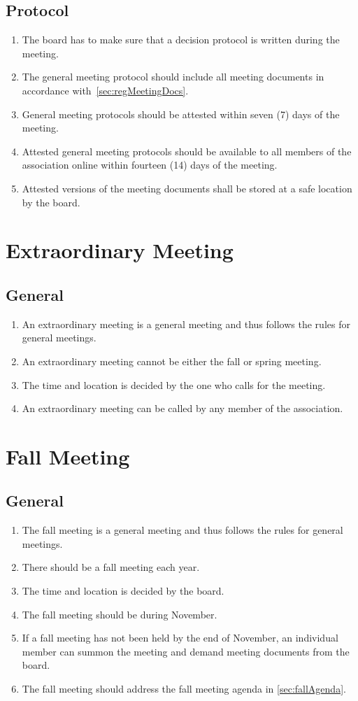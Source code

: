 \subsection{Protocol}
\begin{enumerate}
  \item The board has to make sure that a decision protocol is written during the meeting.
  \item The general meeting protocol should include all meeting documents in accordance with~\ref{sec:regMeetingDocs}.
  \item General meeting protocols should be attested within seven (7) days of the meeting.
  \item Attested general meeting protocols should be available to all members of the association online within fourteen (14) days of the meeting.
  \item Attested versions of the meeting documents shall be stored at a safe location by the board. 
\end{enumerate}

\section*{Extraordinary Meeting}
\subsection{General}
\begin{enumerate}
  \item An extraordinary meeting is a general meeting and thus follows the rules for general meetings.
  \item An extraordinary meeting cannot be either the fall or spring meeting.
  \item The time and location is decided by the one who calls for the meeting.
  \item An extraordinary meeting can be called by any member of the association.
\end{enumerate}

\section*{Fall Meeting}
\subsection{General}
\begin{enumerate}
  \item The fall meeting is a general meeting and thus follows the rules for general meetings.
  \item There should be a fall meeting each year.
  \item The time and location is decided by the board.
  \item The fall meeting should be during November.
  \item If a fall meeting has not been held by the end of November, an individual member can summon the meeting and demand meeting documents from the board.
  \item The fall meeting should address the fall meeting agenda in \ref{sec:fallAgenda}.
\end{enumerate}

